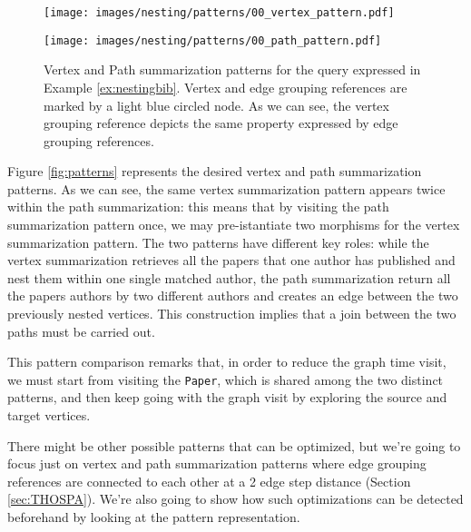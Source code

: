 \begin{figure}[!t]
	\centering
	\begin{minipage}[!t]{0.5\textwidth}
		\centering
		\texttt{[image: images/nesting/patterns/00\_vertex\_pattern.pdf]}
		\label{fig:vertexPat}
	\end{minipage} \begin{minipage}[!t]{0.5\textwidth}
		\centering
		\texttt{[image: images/nesting/patterns/00\_path\_pattern.pdf]}
		\label{fig:pathPat}
	\end{minipage}
	\caption{Vertex and Path summarization patterns for the query expressed in Example \vref{ex:nestingbib}. Vertex and edge grouping references are marked by a light blue circled node. As we can see, the vertex grouping reference depicts the same property expressed by edge grouping references.}
	\label{fig:patterns}
\end{figure}
\begin{example}[continues=ex:nestingbib]
Figure \vref{fig:patterns} represents the desired vertex and path summarization patterns. As we can see, the same vertex summarization pattern appears twice within the path summarization: this means that by visiting the path summarization pattern once, we may pre-istantiate two morphisms for the vertex summarization pattern. The two patterns have different key roles: while the vertex summarization retrieves all the papers that one author has published and nest them within one single matched author, the path summarization return all the papers authors by two different authors and creates an edge between the two previously nested vertices. This construction implies that a join between the two paths must be carried out. 

This pattern comparison remarks that, in order to reduce the graph time visit, we must start from visiting the \texttt{Paper}, which is shared among the two distinct patterns, and then keep going with the graph visit by exploring the source and target vertices. 
\end{example}

There might be other possible patterns that can be optimized, but we're going to focus just on vertex and path summarization patterns where edge grouping references are connected to each other at a 2 edge step distance (Section \ref{sec:THOSPA}). We're also going to show how such optimizations can be detected beforehand by looking at the pattern representation.


